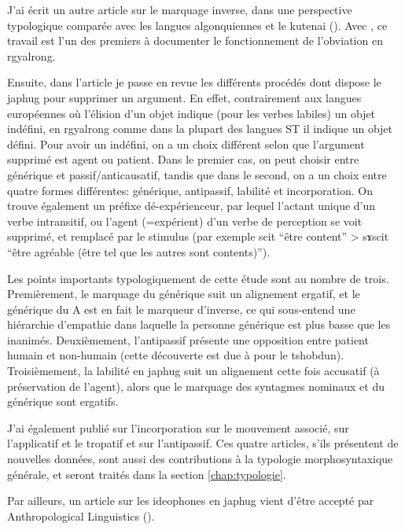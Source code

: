 \documentclass[oldfontcommands,oneside,a4paper,11pt]{memoir}
\newcommand{\ipa}[1]{{\phon #1}} %
\begin{document}
	J'ai écrit un autre article sur le marquage inverse, dans une perspective typologique comparée avec les langues algonquiennes et le kutenai (\citealt{jacques10inverse}). Avec \citet{jackson02rentongdengdi}, ce travail est l'un des premiers à documenter le fonctionnement de l'obviation en rgyalrong.
	
Ensuite, dans l'article \citet{jacques12demotion}   je passe en revue les différents procédés dont dispose le japhug pour supprimer un argument. En effet, contrairement aux langues européennes où l'élision d'un objet indique (pour les verbes labiles) un objet indéfini, en rgyalrong comme dans la plupart des langues ST il indique un objet défini. Pour avoir un indéfini, on a un choix différent selon que l'argument supprimé est agent ou patient. Dans le premier cas, on peut choisir entre générique et passif/anticausatif, tandis que dans le second, on a un choix entre quatre formes différentes: générique, antipassif, labilité et incorporation. On trouve également un préfixe dé-expérienceur, par lequel l'actant unique d'un verbe intransitif, ou l'agent (=expérient) d'un verbe de perception se voit supprimé, et remplacé par le stimulus (par exemple \ipa{scit} ``être content'' > \ipa{sɤscit} ``être agréable (être tel que les autres sont contents)'').
	
	Les points importants typologiquement de cette étude sont au nombre de trois. Premièrement, le marquage du générique suit un alignement ergatif, et le générique du A est en fait le marqueur d'inverse, ce qui sous-entend une hiérarchie d'empathie dans laquelle la personne générique est plus basse que les inanimés. Deuxièmement, l'antipassif présente une opposition entre patient humain et non-humain (cette découverte est due à \citet{jackson06paisheng} pour le tshobdun). Troisièmement, la labilité en japhug suit un alignement cette fois accusatif (à préservation de l'agent), alors que le marquage des syntagmes nominaux et du générique sont ergatifs. 
	
	J'ai également publié \citet{jacques12incorp} sur l'incorporation   \citet{jacques13harmonization} sur le mouvement associé, \citet{jacques13tropative} sur l'applicatif et le tropatif et \citet{jacques14antipassive} sur l'antipassif. Ces quatre articles, s'ils présentent de nouvelles données, sont aussi des contributions à la typologie morphosyntaxique générale, et seront traités dans la section \ref{chap:typologie}. 
	
	Par ailleurs, un article sur les ideophones en japhug vient d'être accepté par Anthropological Linguistics (\citealt{japhug14ideophones}).
	
\end{document}

